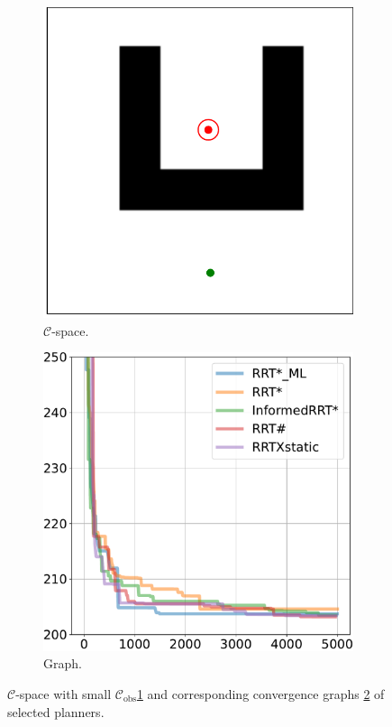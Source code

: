 \documentclass{ctuthesis}
\begin{document}
\begin{figure}[!ht]
  \centering 
  \begin{subfigure}[b]{0.48\textwidth}
      \includegraphics[width=\textwidth]{figChap5/Maze_U.pdf}
      \caption{$\mathcal{C}$-space.}
      \label{fig:maze_U_Cspace} 
  \end{subfigure}  
  \begin{subfigure}[b]{0.5\textwidth}
      \includegraphics[width=\textwidth]{figChap5/graph_U_20pt.pdf}  
      \caption{Graph.}
      \label{fig:maze_U_graphs}
  \end{subfigure}
  \caption{$\mathcal{C}$-space with small $\mathcal{C}_\text{obs} $\ref{fig:maze_U_Cspace} and 
  corresponding convergence graphs \ref{fig:maze_U_graphs} of selected planners.}
  \label{fig:maze_U}
\end{figure}
\end{document}
